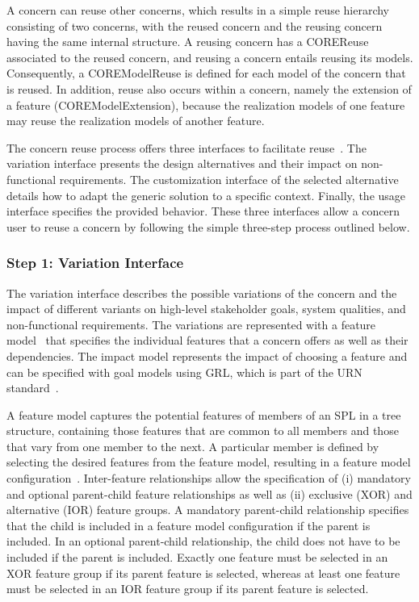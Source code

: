 A concern can reuse other concerns, which results in a simple reuse hierarchy consisting of two concerns, with the reused concern and the reusing concern having the same internal structure. A reusing concern has a {\cls COREReuse} associated to the reused concern, and reusing a concern entails reusing its models. Consequently, a {\cls COREModelReuse} is defined for each model of the concern that is reused. In addition, reuse also occurs within a concern, namely the extension of a feature ({\cls COREModelExtension}), because the realization models of one feature may reuse the realization models of another feature.

The concern reuse process offers three interfaces to facilitate reuse~\cite{alam2013concern}. The variation interface presents the design alternatives and their impact on non-functional requirements. The customization interface of the selected alternative details how to adapt the generic solution to a specific context. Finally, the usage interface specifies the provided behavior. These three interfaces allow a concern user to reuse a concern by following the simple three-step process outlined below.

\subsubsection{Step 1: Variation Interface}

The variation interface describes the possible variations of the concern and the impact of different variants on high-level stakeholder goals, system qualities, and non-functional requirements. The variations are represented with a feature model~\cite{kang1990feature} that specifies the individual features that a concern offers as well as their dependencies. The impact model represents the impact of choosing a feature and can be specified with goal models using GRL, which is part of the URN standard~\cite{itu2012151}.

A feature model captures the potential features of members of an SPL in a tree structure, containing those features that are common to all members and those that vary from one member to the next. A particular member is defined by selecting the desired features from the feature model, resulting in a feature model configuration~\cite{czarnecki2005staged}. Inter-feature relationships allow the specification of (i) mandatory and optional parent-child feature relationships as well as (ii) exclusive (XOR) and alternative (IOR) feature groups. A mandatory parent-child relationship specifies that the child is included in a feature model configuration if the parent is included. In an optional parent-child relationship, the child does not have to be included if the parent is included. Exactly one feature must be selected in an XOR feature group if its parent feature is selected, whereas at least one feature must be selected in an IOR feature group if its parent feature is selected.

